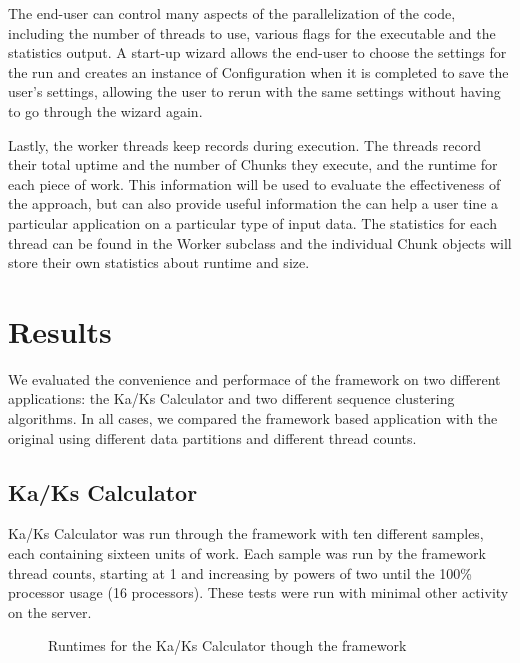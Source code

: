 \documentclass[12pt]{article}
\begin{document}
The end-user can control many aspects of the parallelization of the code,
including the number of threads to use, various flags for the executable and the
statistics output.  A start-up wizard allows the end-user to choose the settings
for the run and creates an instance of Configuration when it is completed to
save the user's settings, allowing the user to rerun with the same settings
without having to go through the wizard again.

Lastly, the worker threads keep records during execution. The threads record
their total uptime and the number of Chunks they execute, and the runtime for
each piece of work. This information will be used to evaluate the effectiveness
of the approach, but can also provide useful information the can help a user
tine a particular application on a particular type of input data. The statistics
for each thread can be found in the Worker subclass and the individual Chunk
objects will store their own statistics about runtime and size.

\section{Results}

We evaluated the convenience and performace of the framework on two different
applications: the Ka/Ks Calculator and two different sequence clustering
algorithms. In all cases, we compared the framework based application with the
original using different data partitions and different thread counts.

\subsection{Ka/Ks Calculator}
Ka/Ks Calculator was run through the framework with ten different samples, each 
containing sixteen units of work. Each sample was run by the framework thread
counts, starting at 1 and increasing by 
powers of two until the 100\% processor usage (16 processors). These tests were run
with minimal other activity on the server.

\begin{figure}
{}
\caption{Runtimes for the Ka/Ks Calculator though the framework}
\label{fig:graph}
\end{figure}
\end{document}
